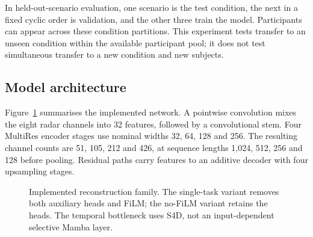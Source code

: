 \documentclass[11pt,a4paper]{article}
\begin{document}
In held-out-scenario evaluation, one scenario is the test condition, the next in a fixed
cyclic order is validation, and the other three train the model. Participants can appear
across these condition partitions. This experiment tests transfer to an unseen condition
within the available participant pool; it does not test simultaneous transfer to a new
condition and new subjects.

\subsection{Model architecture}

Figure~\ref{fig:architecture} summarises the implemented network. A pointwise convolution mixes
the eight radar channels into 32 features, followed by a convolutional stem. Four MultiRes
encoder stages use nominal widths 32, 64, 128 and 256. The resulting channel counts are
51, 105, 212 and 426, at sequence lengths 1,024, 512, 256 and 128 before pooling.
Residual paths carry features to an additive decoder with four upsampling stages.

\begin{figure}[htbp]
\centering
{}
\caption{Implemented reconstruction family. The single-task variant removes both auxiliary
heads and FiLM; the no-FiLM variant retains the heads. The temporal bottleneck uses S4D,
not an input-dependent selective Mamba layer.}
\label{fig:architecture}
\end{figure}
\end{document}
